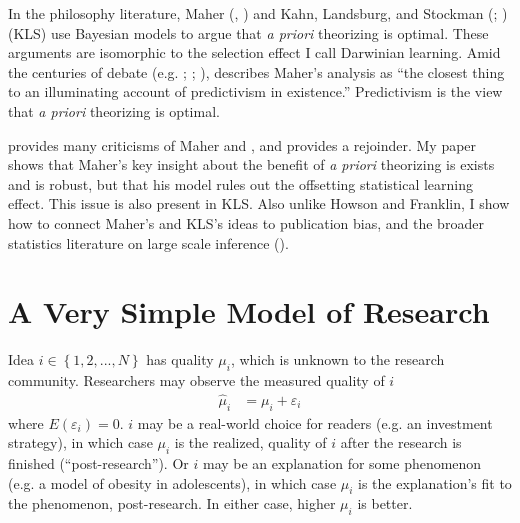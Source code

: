 \documentclass[12pt,english]{article}
\theoremstyle{plain}
\theoremstyle{plain}
\begin{document}
In the philosophy literature, Maher (\citeyear{maher1988prediction}, \citeyear{maher1990prediction}) and Kahn, Landsburg, and Stockman (\citeyear{kahn1992novel}; \citeyear{kahn1996positive}) (KLS) use Bayesian models to argue that \emph{a priori} theorizing is optimal. These arguments are isomorphic to the selection effect I call Darwinian learning. Amid the centuries of  debate  (e.g. \citet{leibniz1678letter}; \citet{newton1726scholium}; \citet{keynes1921treatise}), \citet{barnes1996discussion} describes Maher's analysis as ``the closest thing to an illuminating account of predictivism in existence.'' Predictivism is the view that \emph{a priori} theorizing is optimal.

\citet{howson1991maher} provides many criticisms of Maher \citeyearpar{maher1988prediction} and \citeyearpar{maher1990prediction}, and  \citet{maher1993discussion} provides a rejoinder.  My paper shows that Maher's key insight about the benefit of \emph{a priori} theorizing is exists and is robust, but that his model rules out the offsetting statistical learning effect. This issue is also present in KLS.  Also unlike Howson and Franklin, I show how to connect Maher's and KLS's ideas to publication bias, and the broader statistics literature on large scale inference  (\citet{efron2012large}).





\section{A Very Simple Model of Research}\label{sec:ez}

Idea $i \in \left\{ 1,2,...,N\right\} $ has quality $\mu_{i}$, which is unknown to the research community. Researchers may observe the measured quality of $i$ 
\begin{align}
\hat{\mu}_{i} &= \mu_{i} + \varepsilon_{i}
\label{eq:ez:muhat}
\end{align}
where $E\left(\varepsilon_{i}\right) = 0$. $i$ may be a real-world choice for readers (e.g. an investment strategy), in which case $\mu_{i}$ is the realized, quality of $i$ after the research is finished (``post-research''). Or $i$ may be an explanation for some phenomenon (e.g. a model of obesity in adolescents), in which case $\mu_{i}$ is the explanation's fit to the phenomenon, post-research. In either case, higher $\mu_{i}$ is better.
\end{document}
